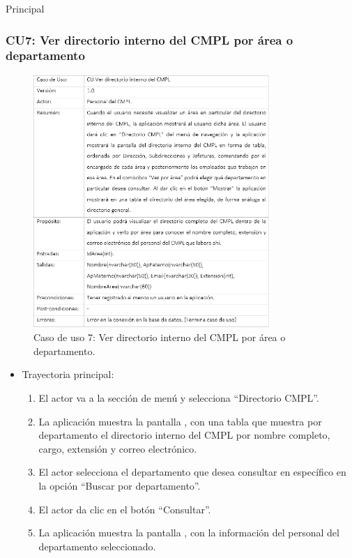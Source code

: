 \begin{UCtrayectoria}{Principal}
		\subsubsection{CU7: Ver directorio interno del CMPL por área o departamento}
			\begin{figure}[htbp!]
				\centering
					\includegraphics[width=0.8\textwidth]{images/CU/CU7}
					\caption{Caso de uso 7: Ver directorio interno del CMPL por área o departamento.}
				\label{Tabla}
			\end{figure}
			
			\begin{itemize}
				\item Trayectoria principal:
					\begin{enumerate}
						\item El actor va a la sección de menú y selecciona ``Directorio CMPL''.
						\item La aplicación muestra la pantalla , con una tabla que muestra por departamento el directorio interno del CMPL por nombre completo, cargo, extensión y correo electrónico.
						\item El actor selecciona el departamento que desea consultar en específico en la opción ``Buscar por departamento''.
						\item El actor da clic en el botón ``Consultar''.
						\item La aplicación muestra la pantalla , con la información del personal del departamento seleccionado. 
					\end{enumerate}
			\end{itemize}
			

\end{UCtrayectoria}

